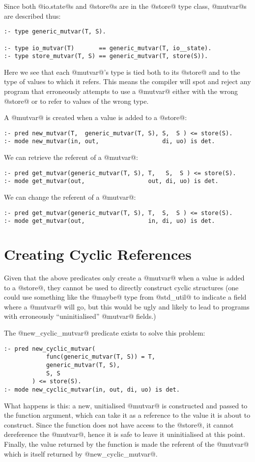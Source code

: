 Since both @io.state@s and @store@s are in the @store@ type class,
@mutvar@s are described thus:
\begin{verbatim}
:- type generic_mutvar(T, S).

:- type io_mutvar(T)       == generic_mutvar(T, io__state).
:- type store_mutvar(T, S) == generic_mutvar(T, store(S)).
\end{verbatim}
Here we see that each @mutvar@'s type is tied both to its @store@ and to
the type of values to which it refers.  This means the compiler will
spot and reject any program that erroneously attempts to use a @mutvar@
either with the wrong @store@ or to refer to values of the wrong type.

A @mutvar@ is created when a value is added to a @store@:
\begin{verbatim}
:- pred new_mutvar(T,  generic_mutvar(T, S), S,  S ) <= store(S).
:- mode new_mutvar(in, out,                  di, uo) is det.
\end{verbatim}

We can retrieve the referent of a @mutvar@:
\begin{verbatim}
:- pred get_mutvar(generic_mutvar(T, S), T,   S,  S ) <= store(S).
:- mode get_mutvar(out,                  out, di, uo) is det.
\end{verbatim}

We can change the referent of a @mutvar@:
\begin{verbatim}
:- pred get_mutvar(generic_mutvar(T, S), T,  S,  S ) <= store(S).
:- mode get_mutvar(out,                  in, di, uo) is det.
\end{verbatim}

\section{Creating Cyclic References}

Given that the above predicates only create a @mutvar@ when a value is
added to a @store@, they cannot be used to directly construct cyclic
structures (one could use something like the @maybe@ type from
@std_util@ to indicate a field where a @mutvar@ will go, but this would
be ugly and likely to lead to programs with erroneously
``uninitialised'' @mutvar@ fields.)

The @new_cyclic_mutvar@ predicate exists to solve this problem:
\begin{verbatim}
:- pred new_cyclic_mutvar(
            func(generic_mutvar(T, S)) = T,
            generic_mutvar(T, S),
            S, S
        ) <= store(S).
:- mode new_cyclic_mutvar(in, out, di, uo) is det.
\end{verbatim}
What happens is this: a new, unitialised @mutvar@ is constructed and
passed to the function argument, which can take it as a reference to the
value it is about to construct.  Since the function does not have access
to the @store@, it cannot dereference the @mutvar@, hence it is safe to
leave it uninitialised at this point.  Finally, the value returned by
the function is made the referent of the @mutvar@ which is itself
returned by @new_cyclic_mutvar@.

